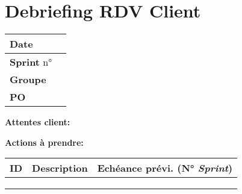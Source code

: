 \documentclass{article}
\begin{document}
\section*{\centering Debriefing RDV Client}

\vspace{1cm}
\centering
\begin{tabular}{|l|p{4cm}|}
    \hline
    \textbf{Date} & \\ \hline
    \textbf{Sprint} n° & \\ \hline
    \textbf{Groupe} & \\ \hline
    \textbf{PO} & \\ \hline
 \end{tabular}

\raggedright


\vspace{1.5cm}
\textbf{\Large Attentes client:}
\vspace{5cm}

\textbf{\Large Actions à prendre:}

\vspace{0.5cm}

\begin{tabular}{|p{}|p{}|p{5cm}|}
    \hline
    \textbf{ID} & \textbf{Description} & \textbf{Echéance prévi. (N° \textit{Sprint})} \\\hline
        & & \\[2cm]\hline
        & & \\[2cm]\hline
        & & \\[2cm]\hline
 \end{tabular}

 
\thispagestyle{empty}
\end{document}
